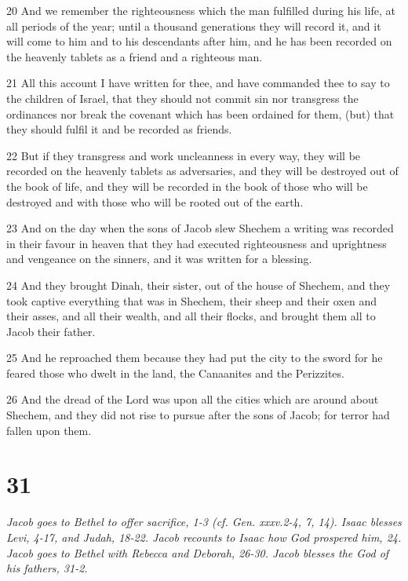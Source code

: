 \par 20 And we remember the righteousness which the man fulfilled during his life, at all periods of the year; until a thousand generations they will record it, and it will come to him and to his descendants after him, and he has been recorded on the heavenly tablets as a friend and a righteous man.
\par 21 All this account I have written for thee, and have commanded thee to say to the children of Israel, that they should not commit sin nor transgress the ordinances nor break the covenant which has been ordained for them, (but) that they should fulfil it and be recorded as friends.
\par 22 But if they transgress and work uncleanness in every way, they will be recorded on the heavenly tablets as adversaries, and they will be destroyed out of the book of life, and they will be recorded in the book of those who will be destroyed and with those who will be rooted out of the earth.
\par 23 And on the day when the sons of Jacob slew Shechem a writing was recorded in their favour in heaven that they had executed righteousness and uprightness and vengeance on the sinners, and it was written for a blessing.
\par 24 And they brought Dinah, their sister, out of the house of Shechem, and they took captive everything that was in Shechem, their sheep and their oxen and their asses, and all their wealth, and all their flocks, and brought them all to Jacob their father.
\par 25 And he reproached them because they had put the city to the sword for he feared those who dwelt in the land, the Canaanites and the Perizzites.
\par 26 And the dread of the Lord was upon all the cities which are around about Shechem, and they did not rise to pursue after the sons of Jacob; for terror had fallen upon them.

\chapter{31}

\par \textit{Jacob goes to Bethel to offer sacrifice, 1-3 (cf. Gen. xxxv.2-4, 7, 14). Isaac blesses Levi, 4-17, and Judah, 18-22. Jacob recounts to Isaac how God prospered him, 24. Jacob goes to Bethel with Rebecca and Deborah, 26-30. Jacob blesses the God of his fathers, 31-2.}

